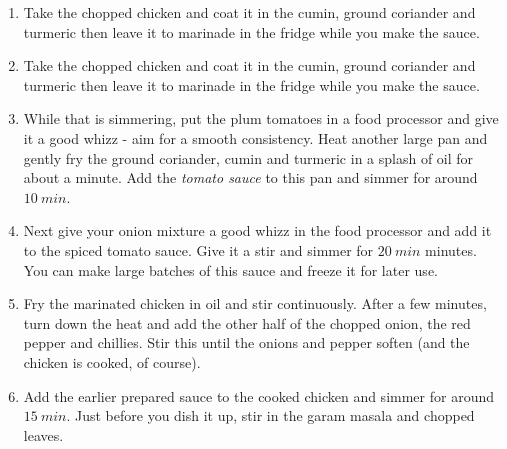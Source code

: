 \documentclass[11pt,a4paper]{article}
\begin{document}
\begin{enumerate}
  \item Take the chopped chicken and coat it in the cumin, ground coriander and turmeric then leave it to marinade in the fridge while you make the sauce.
  \item Take the chopped chicken and coat it in the cumin, ground coriander and turmeric then leave it to marinade in the fridge while you make the sauce.
  \item While that is simmering, put the plum tomatoes in a food processor and give it a good whizz - aim for a smooth consistency. Heat another large pan and gently fry the ground coriander, cumin and turmeric in a splash of oil for about a minute. Add the \textit{tomato sauce} to this pan and simmer for around $ \qty{10}{min} $.
  \item Next give your onion mixture a good whizz in the food processor and add it to the spiced tomato sauce. Give it a stir and simmer for $ \qty{20}{min} $ minutes. You can make large batches of this sauce and freeze it for later use.
  \item Fry the marinated chicken in oil and stir continuously. After a few minutes, turn down the heat and add the other half of the chopped onion, the red pepper and chillies. Stir this until the onions and pepper soften (and the chicken is cooked, of course).
  \item Add the earlier prepared sauce to the cooked chicken and simmer for around $ \qty{15}{min} $. Just before you dish it up, stir in the garam masala and chopped leaves. 

\end{enumerate}
\end{document}
